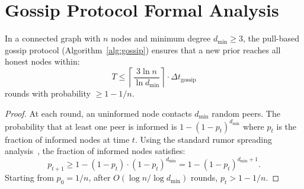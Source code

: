 \section{Gossip Protocol Formal Analysis}

\label{app:gossip}

\begin{theorem}
In a connected graph with $n$ nodes and minimum degree $d_{\min} \geq 3$, the
pull-based gossip protocol (Algorithm~\ref{alg:gossip}) ensures that a new
prior reaches all honest nodes within:
\begin{equation}
    T \leq \left\lceil \frac{3 \ln n}{\ln d_{\min}} \right\rceil \cdot \Delta t_{\text{gossip}}
\end{equation}
rounds with probability $\geq 1 - 1/n$.
\end{theorem}

\begin{proof}
At each round, an uninformed node contacts $d_{\min}$ random peers. The
probability that at least one peer is informed is $1 - (1 - p_t)^{d_{\min}}$
where $p_t$ is the fraction of informed nodes at time $t$. Using the standard
rumor spreading analysis~\cite{demers1987epidemic}, the fraction of informed
nodes satisfies:
\begin{equation}
    p_{t+1} \geq 1 - (1 - p_t) \cdot (1 - p_t)^{d_{\min}} = 1 - (1 - p_t)^{d_{\min}+1}.
\end{equation}
Starting from $p_0 = 1/n$, after $O(\log n / \log d_{\min})$ rounds, $p_t > 1 - 1/n$.
\end{proof}

